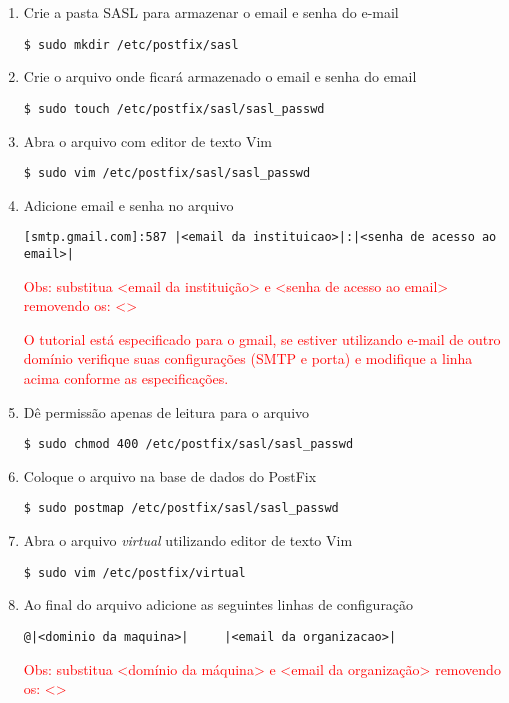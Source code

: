 \begin{enumerate}[label=\alph*)]
\item Crie a pasta SASL para armazenar o email e senha do e-mail
\begin{lstlisting}
$ sudo mkdir /etc/postfix/sasl
\end{lstlisting}

\item Crie o arquivo onde ficará armazenado o email e senha do email
\begin{lstlisting}
$ sudo touch /etc/postfix/sasl/sasl_passwd
\end{lstlisting}

\item Abra o arquivo com editor de texto Vim
\begin{lstlisting}
$ sudo vim /etc/postfix/sasl/sasl_passwd
\end{lstlisting}

\item Adicione email e senha no arquivo
\begin{lstlisting}[style=base]
	[smtp.gmail.com]:587 |<email da instituicao>|:|<senha de acesso ao email>|
\end{lstlisting}
\textcolor{red}{{\scriptsize Obs: substitua <email da instituição> e <senha de acesso ao email> removendo os: <> }}

\textcolor{red}{{\scriptsize O tutorial está especificado para o gmail, se estiver utilizando e-mail de outro domínio verifique suas configurações (SMTP e porta) e modifique a linha acima conforme as especificações. }}

\item Dê permissão apenas de leitura para o arquivo
\begin{lstlisting}
$ sudo chmod 400 /etc/postfix/sasl/sasl_passwd
\end{lstlisting}

\item Coloque o arquivo na base de dados do PostFix
\begin{lstlisting}
$ sudo postmap /etc/postfix/sasl/sasl_passwd
\end{lstlisting}

\item Abra o arquivo \emph{virtual} utilizando editor de texto Vim
\begin{lstlisting}
$ sudo vim /etc/postfix/virtual
\end{lstlisting}

\item Ao final do arquivo adicione as seguintes linhas de configuração
\begin{lstlisting}[style=base]
@|<dominio da maquina>|		|<email da organizacao>|
\end{lstlisting}
\textcolor{red}{{\scriptsize Obs: substitua <domínio da máquina> e <email da organização> removendo os: <> }}


\end{enumerate}
